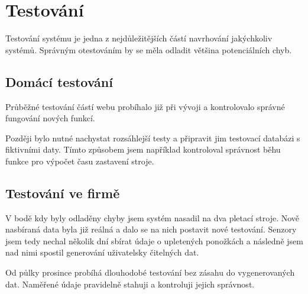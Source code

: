 \chapter{Testování}
Testování systému je jedna z nejdůležitějších částí navrhování jakýchkoliv systémů.
Správným otestováním by se měla odladit většina potenciálních chyb.

\section{Domácí testování}
Průběžné testování částí webu probíhalo již při vývoji a kontrolovalo správné fungování nových funkcí.

Později bylo nutné nachystat rozsáhlejší testy a připravit jim testovací databázi s fiktivními daty.
Tímto způsobem jsem například kontroloval správnost běhu funkce pro výpočet času zastavení stroje.


\section{Testování ve firmě}
V bodě kdy byly odladěny chyby jsem systém nasadil na dva pletací stroje.
Nově nasbíraná data byla již reálná a dalo se na nich postavit nové testování.
Senzory jsem tedy nechal několik dní sbírat údaje o upletených ponožkách a následně jsem nad nimi spostil generování uživatelsky čitelných dat.

Od půlky prosince probíhá dlouhodobé testování bez zásahu do vygenerovaných dat. Naměřené údaje pravidelně stahuji a kontroluji jejich správnost.

\newpage